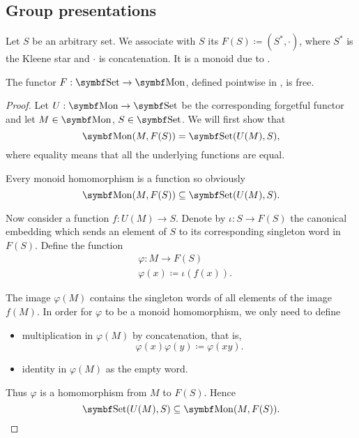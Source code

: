 \subsection{Group presentations}\label{subsec:group_presentations}

\begin{definition}\label{def:free_monoid}\cite[306]{Knapp2016BAlg}
  Let \( S \) be an arbitrary set. We associate with \( S \) its  \( F(S) \coloneqq (S^{*}, \cdot) \), where \( S^{*} \) is the Kleene star and \( \cdot \) is concatenation. It is a monoid due to .
\end{definition}

\begin{proposition}\label{thm:free_monoid_is_free_functor}
  The functor \( F: \Cat{Set} \to \Cat{Mon} \), defined pointwise in , is free.
\end{proposition}
\begin{proof}
  Let \( U: \Cat{Mon} \to \Cat{Set} \) be the corresponding forgetful functor and let \( M \in \Cat{Mon} \), \( S \in \Cat{Set} \). We will first show that
  \begin{equation*}
    \Cat{Mon}(M, F(S)) = \Cat{Set}(U(M), S),
  \end{equation*}
  where equality means that all the underlying functions are equal.

  Every monoid homomorphism is a function so obviously
  \begin{equation*}
    \Cat{Mon}(M, F(S)) \subseteq \Cat{Set}(U(M), S).
  \end{equation*}

  Now consider a function \( f: U(M) \to S \). Denote by \( \iota: S \to F(S) \) the canonical embedding which sends an element of \( S \) to its corresponding singleton word in \( F(S) \). Define the function
  \begin{align*}
    &\varphi: M \to F(S) \\
    &\varphi(x) \coloneqq \iota(f(x)).
  \end{align*}

  The image \( \varphi(M) \) contains the singleton words of all elements of the image \( f(M) \). In order for \( \varphi \) to be a monoid homomorphism, we only need to define
  \begin{itemize}
    \item multiplication in \( \varphi(M) \) by concatenation, that is,
    \begin{equation*}
      \varphi(x) \varphi(y) \coloneqq \varphi(xy).
    \end{equation*}

    \item identity in \( \varphi(M) \) as the empty word.
  \end{itemize}

  Thus \( \varphi \) is a homomorphism from \( M \) to \( F(S) \). Hence
  \begin{equation*}
    \Cat{Set}(U(M), S) \subseteq \Cat{Mon}(M, F(S)).
  \end{equation*}
\end{proof}

